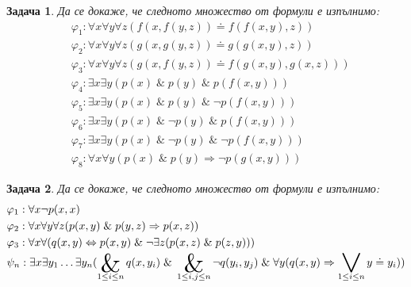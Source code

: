 \documentclass[12pt]{article}
\newcommand{\logand}{\; \& \;}
\DeclareMathOperator*{\bigand}{\scalerel*{\&}{\prod}}
\DeclareMathOperator*{\bigor}{\scalerel*{\lor}{\sum}}
\newtheorem{problem}{Задача}[section]
\theoremstyle{definition}
\begin{document}
\begin{problem}
Да се докаже, че следното множество от формули е изпълнимо:
\begin{align*}
	 & \varphi_1 : \forall x \forall y \forall z (f(x, f(y, z)) \doteq f(f(x, y), z))       \\
	 & \varphi_2 : \forall x \forall y \forall z (g(x, g(y, z)) \doteq g(g(x, y), z))       \\
	 & \varphi_3 : \forall x \forall y \forall z (g(x, f(y, z)) \doteq f(g(x, y), g(x, z))) \\
	 & \varphi_4 : \exists x \exists y (p(x) \logand p(y) \logand p(f(x, y)))               \\
	 & \varphi_5 : \exists x \exists y (p(x) \logand p(y) \logand \neg p(f(x, y)))          \\
	 & \varphi_6 : \exists x \exists y (p(x) \logand \neg p(y) \logand p(f(x, y)))          \\
	 & \varphi_7 : \exists x \exists y (p(x) \logand \neg p(y) \logand \neg p(f(x, y)))     \\
	 & \varphi_8 : \forall x \forall y (p(x) \logand p(y) \Rightarrow \neg p(g(x, y)))
\end{align*}
\end{problem}

\begin{problem}
Да се докаже, че следното множество от формули е изпълнимо:
\begin{align*}
	 & \varphi_1 : \forall x \neg p(x, x)                                                     \\
   & \varphi_2 : \forall x \forall y \forall z (p(x, y) \logand p(y, z) \Rightarrow p(x, z)) \\
   & \varphi_3 : \forall x \forall (q(x, y) \Leftrightarrow p(x, y) \logand \neg \exists z (p(x, z) \logand p(z, y))) \\
   & \psi_n : \exists x \exists y_1 \dots \exists y_n (\bigand_{1 \leq i \leq n} q(x, y_i) \logand \bigand_{1 \leq i, j \leq n} \neg q(y_i, y_j) \logand \forall y (q(x, y) \Rightarrow \bigor_{1 \leq i \leq n} y \doteq y_i))
\end{align*}
\end{problem}
\end{document}
